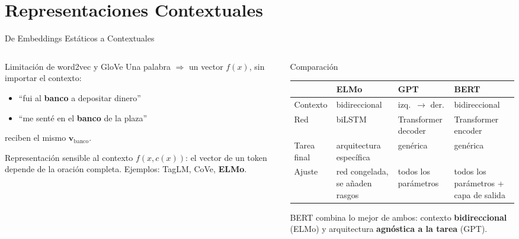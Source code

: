 \documentclass[aspectratio=169, 10pt]{beamer}
\begin{document}
\section{Representaciones Contextuales}

\begin{frame}{De Embeddings Est\'aticos a Contextuales}

	\begin{columns}[T]
		\begin{column}{0.5\textwidth}
			\begin{alertblock}{Limitaci\'on de word2vec y GloVe}
				\small
				Una palabra $\Rightarrow$ un vector $f(x)$, sin importar el contexto:
				\begin{itemize}
					\item ``fui al \textbf{banco} a depositar dinero''
					\item ``me sent\'e en el \textbf{banco} de la plaza''
				\end{itemize}
				reciben el mismo $\mathbf{v}_{\text{banco}}$.
			\end{alertblock}

			\begin{block}{Representaci\'on sensible al contexto}
				\small
				$f(x, c(x))$: el vector de un token depende de la oraci\'on completa. Ejemplos: TagLM, CoVe, \textbf{ELMo}.
			\end{block}
		\end{column}

		\begin{column}{0.47\textwidth}
			\begin{block}{Comparaci\'on}
				\scriptsize
				\setlength{\tabcolsep}{3pt}
				\begin{tabular}{@{}l>{\raggedright}p{1.5cm}>{\raggedright}p{1.5cm}>{\raggedright\arraybackslash}p{1.65cm}@{}}
					\toprule
					& \textbf{ELMo} & \textbf{GPT} & \textbf{BERT} \\
					\midrule
					Contexto & bidireccional & izq.\ $\to$ der. & bidireccional \\
					Red & biLSTM & Transformer decoder & Transformer encoder \\
					Tarea final & arquitectura espec\'ifica & gen\'erica & gen\'erica \\
					Ajuste & red congelada, se a\~naden rasgos & todos los par\'ametros & todos los par\'ametros + capa de salida \\
					\bottomrule
				\end{tabular}
			\end{block}

			\small
			BERT combina lo mejor de ambos: contexto \textbf{bidireccional} (ELMo) y arquitectura \textbf{agn\'ostica a la tarea} (GPT).
		\end{column}
	\end{columns}

\end{frame}
\end{document}
